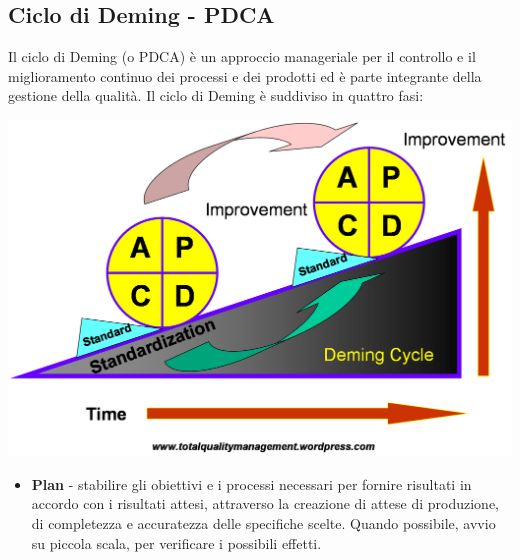 {  \subsection{Ciclo di Deming -  PDCA}
  Il ciclo di Deming (o PDCA) è un approccio manageriale per il
  controllo e il
  miglioramento continuo dei processi e dei prodotti ed è
  parte integrante della gestione della qualità.
  Il ciclo di Deming è suddiviso in quattro fasi: \\



  \begin{center}
    \includegraphics[scale=0.3]{img/deming.png}
  \end{center}



  \begin{itemize}
  \item  \textbf{Plan} - stabilire gli obiettivi e i processi necessari per
fornire risultati in accordo con i risultati attesi, attraverso la
creazione di attese di produzione, di completezza e accuratezza delle
specifiche scelte. Quando possibile, avvio su piccola scala, per
verificare i possibili effetti.


\end{itemize}}
